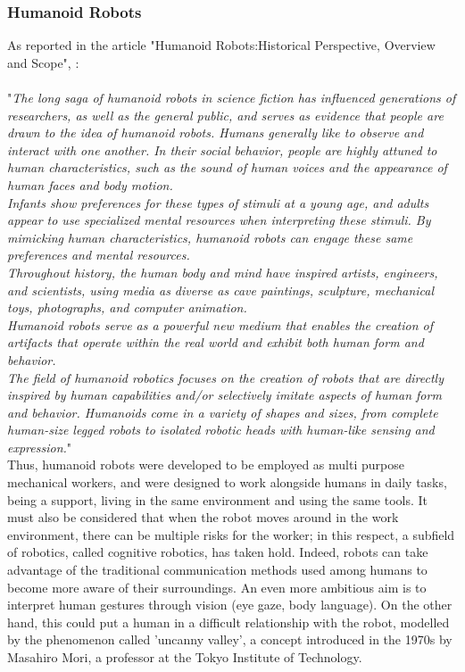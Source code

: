 \subsubsection{Humanoid Robots}
As reported in the article "Humanoid Robots:Historical Perspective, Overview and Scope", \citet{Siciliano2020}:\\
\\
"\textit{The long saga of humanoid robots in science fiction has influenced generations
of researchers, as well as the general public, and serves as evidence that people
are drawn to the idea of humanoid robots. Humans generally like to observe and
interact with one another. In their social behavior, people are highly attuned to
human characteristics, such as the sound of human voices and the appearance of
human faces and body motion. \\
Infants show preferences for these types of stimuli at
a young age, and adults appear to use specialized mental resources when interpreting these stimuli. By mimicking human characteristics, humanoid robots can engage
these same preferences and mental resources.\\
Throughout history, the human body and mind have inspired artists, engineers,
and scientists, using media as diverse as cave paintings, sculpture, mechanical toys,
photographs, and computer animation. \\
Humanoid robots serve as a powerful new
medium that enables the creation of artifacts that operate within the real world
and exhibit both human form and behavior. 
\\The field of humanoid robotics focuses
on the creation of robots that are directly inspired by human capabilities and/or
selectively imitate aspects of human form and behavior. Humanoids come in a
variety of shapes and sizes, from complete human-size legged robots to isolated
robotic heads with human-like sensing and expression.}"\\
Thus, humanoid robots were developed to be employed as multi purpose mechanical workers, and were designed to work alongside humans in daily tasks, being a support, living in the same environment and using the same tools.
It must also be considered that when the robot moves around in the work environment, there can be multiple risks for the worker; in this respect, a subfield of robotics, called cognitive robotics, has taken hold.
Indeed, robots can take advantage of the traditional communication methods used among humans to become more aware of their surroundings.
An even more ambitious aim is to interpret human gestures through vision (eye gaze, body language). On the other hand, this could put a human in a difficult relationship with the robot, modelled by the phenomenon called 'uncanny valley', a concept introduced in the 1970s by Masahiro Mori, a professor at the Tokyo Institute of Technology.
